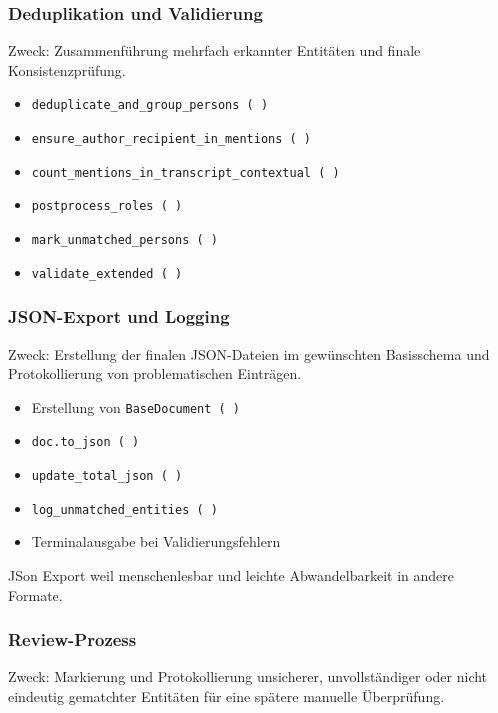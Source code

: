 \documentclass[12pt, a4paper, ngerman, bidi=default]{article}
\begin{document}
\subsubsection{Deduplikation und Validierung}
Zweck: Zusammenführung mehrfach erkannter Entitäten und finale Konsistenzprüfung.
\begin{itemize}
\item \texttt{deduplicate\_and\_group\_persons~(~)}
\item \texttt{ensure\_author\_recipient\_in\_mentions~(~)}
\item \texttt{count\_mentions\_in\_transcript\_contextual~(~)}
\item \texttt{postprocess\_roles~(~)}
\item \texttt{mark\_unmatched\_persons~(~)}
\item \texttt{validate\_extended~(~)}
\end{itemize}

\subsubsection*{JSON-Export und Logging}
Zweck: Erstellung der finalen JSON-Dateien im gewünschten Basisschema und Protokollierung von problematischen Einträgen.
\begin{itemize}
\item Erstellung von \texttt{BaseDocument~(~)}
\item \texttt{doc.to\_json~(~)}
\item \texttt{update\_total\_json~(~)}
\item \texttt{log\_unmatched\_entities~(~)}
\item Terminalausgabe bei Validierungsfehlern
\end{itemize}

JSon Export weil menschenlesbar und leichte Abwandelbarkeit in andere Formate.

\subsubsection{Review-Prozess}
Zweck: Markierung und Protokollierung unsicherer, unvollständiger oder nicht eindeutig gematchter Entitäten für eine spätere manuelle Überprüfung.
\end{document}
